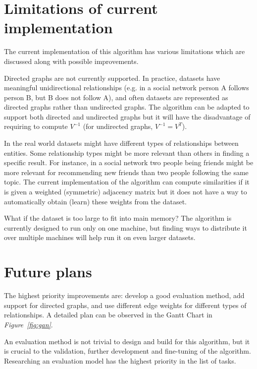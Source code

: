 \documentclass[12pt]{report}
\begin{document}
\section{Limitations of current implementation}
%
The current implementation of this algorithm has various limitations which are
discussed along with possible improvements.


Directed graphs are not currently supported. In practice, datasets have meaningful
unidirectional relationships (e.g. in a social network person A follows person B,
but B does not follow A), and often datasets are represented as directed graphs
rather than undirected graphs. The algorithm can be adapted to support both directed
and undirected graphs but it will have the disadvantage of requiring to compute
$V^{-1}$ (for undirected graphs, $V^{-1} = V^T$).


In the real world datasets might have different types of relationships between
entities. Some relationship types might be more relevant than others in finding
a specific result. For instance, in a social network two people being friends
might be more relevant for recommending new friends than two people following the
same topic. The current implementation of the algorithm can compute similarities
if it is given a weighted (symmetric) adjacency matrix but it does not have a
way to automatically obtain (learn) these weights from the dataset.


What if the dataset is too large to fit into main memory? The algorithm is
currently designed to run only on one machine, but finding ways to distribute it
over multiple machines will help run it on even larger datasets.

%
%
\section{Future plans}
%
The highest priority improvements are: develop a good evaluation method, add support
for directed graphs, and use different edge weights for different types of relationships.
A detailed plan can be observed in the Gantt Chart in \emph{Figure~\ref{fig:gan}}.


An evaluation method is not trivial to design and build for this algorithm, but
it is crucial to the validation, further development and fine-tuning of the algorithm.
Researching an evaluation model has the highest priority in the list of tasks.
\end{document}
